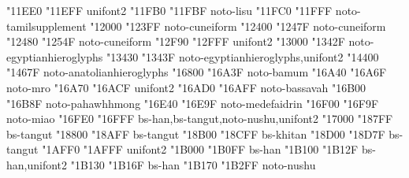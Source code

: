 \documentclass{article}
\begin{document}
                                            { "11EE0} { "11EFF} {unifont2}
                                    { "11FB0} { "11FBF} {noto-lisu}
                                   { "11FC0} { "11FFF} {noto-tamilsupplement}
                                          { "12000} { "123FF} {noto-cuneiform}
                  { "12400} { "1247F} {noto-cuneiform}
                           { "12480} { "1254F} {noto-cuneiform}
                                       { "12F90} { "12FFF} {unifont2}
                               { "13000} { "1342F} {noto-egyptianhieroglyphs}
                { "13430} { "1343F} {noto-egyptianhieroglyphs,unifont2}
                              { "14400} { "1467F} {noto-anatolianhieroglyphs}
                                   { "16800} { "16A3F} {noto-bamum}
                                                { "16A40} { "16A6F} {noto-mro}
                                             { "16A70} { "16ACF} {unifont2}
                                          { "16AD0} { "16AFF} {noto-bassavah}
                                       { "16B00} { "16B8F} {noto-pahawhhmong}
                                        { "16E40} { "16E9F} {noto-medefaidrin}
                                               { "16F00} { "16F9F} {noto-miao}
                { "16FE0} { "16FFF} {bs-han,bs-tangut,noto-nushu,unifont2}
                                             { "17000} { "187FF} {bs-tangut}
                                  { "18800} { "18AFF} {bs-tangut}
                                { "18B00} { "18CFF} {bs-khitan}
                                  { "18D00} { "18D7F} {bs-tangut}
                                    { "1AFF0} { "1AFFF} {unifont2}
                                    { "1B000} { "1B0FF} {bs-han}
                                    { "1B100} { "1B12F} {bs-han,unifont2}
                               { "1B130} { "1B16F} {bs-han}
                                              { "1B170} { "1B2FF} {noto-nushu}
\end{document}
